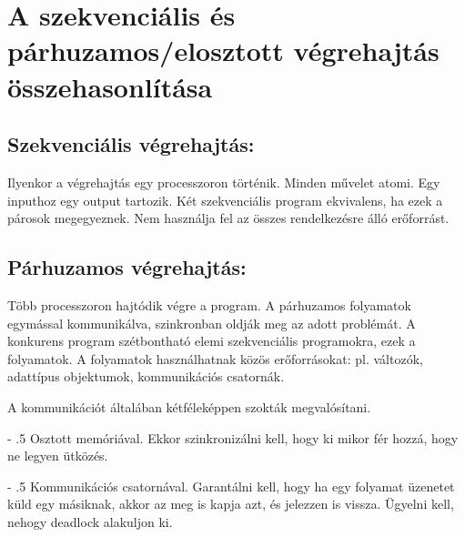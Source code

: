 \documentclass[12pt,margin=0px]{article}
\makeatletter
\renewcommand\paragraph{%
	\@startsection{paragraph}{4}{0mm}%
	{-\baselineskip}%
	{.5\baselineskip}%
	{\normalfont\normalsize\bfseries}}
\makeatother
\begin{document}
    \section*{A szekvenciális és	párhuzamos/elosztott végrehajtás összehasonlítása}
	
    \subsection*{Szekvenciális végrehajtás:}

    \noindent Ilyenkor a végrehajtás egy processzoron történik. Minden művelet atomi. Egy inputhoz egy output tartozik. Két szekvenciális program ekvivalens, ha ezek a párosok megegyeznek. Nem használja fel az összes rendelkezésre álló erőforrást.

    \subsection*{Párhuzamos végrehajtás:}		

    \noindent Több processzoron hajtódik végre a program. A párhuzamos folyamatok egymással kommunikálva, szinkronban oldják meg az adott problémát. A konkurens program szétbontható elemi szekvenciális programokra, ezek a folyamatok. A folyamatok használhatnak közös erőforrásokat: pl. változók, adattípus  objektumok, kommunikációs csatornák.
	
	\noindent A kommunikációt általában kétféleképpen szokták megvalósítani.

	\paragraph{Osztott memóriával.} Ekkor szinkronizálni kell, hogy ki mikor fér hozzá, hogy ne legyen ütközés.

    \paragraph{Kommunikációs csatornával.} Garantálni kell, hogy ha egy folyamat üzenetet küld egy másiknak, akkor az meg is kapja azt, és jelezzen is vissza. Ügyelni kell, nehogy deadlock alakuljon ki.
		
\end{document}
